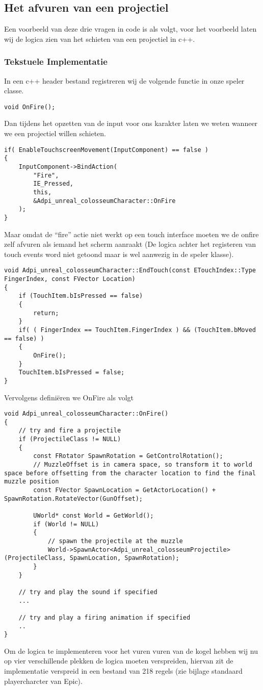 \subsection{Het afvuren van een projectiel}
Een voorbeeld van deze drie vragen in code is als volgt, voor het voorbeeld laten wij de logica zien van het schieten van een projectiel in c++.

\subsubsection{Tekstuele Implementatie}
In een c++ header bestand registreren wij de volgende functie in onze speler classe.
\begin{lstlisting}
void OnFire();
\end{lstlisting}
Dan tijdens het opzetten van de input voor ons karakter laten we weten wanneer we een projectiel willen schieten.

\begin{lstlisting}
if( EnableTouchscreenMovement(InputComponent) == false )
{
	InputComponent->BindAction(
		"Fire", 
		IE_Pressed, 
		this, 
		&Adpi_unreal_colosseumCharacter::OnFire
	);
}
\end{lstlisting}
Maar omdat de “fire” actie niet werkt op een touch interface moeten we de onfire zelf afvuren als iemand het scherm aanraakt (De logica achter het registeren van touch events word niet getoond maar is wel aanwezig in de speler klasse).

\begin{lstlisting}
void Adpi_unreal_colosseumCharacter::EndTouch(const ETouchIndex::Type FingerIndex, const FVector Location)
{
	if (TouchItem.bIsPressed == false)
	{
		return;
	}
	if( ( FingerIndex == TouchItem.FingerIndex ) && (TouchItem.bMoved == false) )
	{
		OnFire();
	}
	TouchItem.bIsPressed = false;
}
\end{lstlisting}
Vervolgens definiëren we OnFire als volgt

\begin{lstlisting}
void Adpi_unreal_colosseumCharacter::OnFire()
{ 
	// try and fire a projectile
	if (ProjectileClass != NULL)
	{
		const FRotator SpawnRotation = GetControlRotation();
		// MuzzleOffset is in camera space, so transform it to world space before offsetting from the character location to find the final muzzle position
		const FVector SpawnLocation = GetActorLocation() + SpawnRotation.RotateVector(GunOffset);

		UWorld* const World = GetWorld();
		if (World != NULL)
		{
			// spawn the projectile at the muzzle
			World->SpawnActor<Adpi_unreal_colosseumProjectile>(ProjectileClass, SpawnLocation, SpawnRotation);
		}
	}

	// try and play the sound if specified
	...

	// try and play a firing animation if specified
	..
}
\end{lstlisting}
Om de logica te implementeren voor het vuren vuren van de kogel hebben wij nu op vier verschillende plekken de logica moeten verspreiden, hiervan zit de implementatie verspreid in een bestand van 218 regels (zie bijlage standaard playercharcter van Epic).

